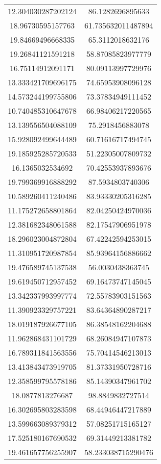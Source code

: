 \begin{table}
\begin{tabular}{cc}
12.304030287202124 & 86.1282696895633 \\
18.96730595157763 & 61.735632011487894 \\
19.84669496668335 & 65.3112018632176 \\
19.26841121591218 & 58.87085823977779 \\
16.75114912091171 & 80.09113997729976 \\
13.333421709696175 & 74.65953908096128 \\
14.573244199755806 & 73.37834949111452 \\
10.740485310647678 & 66.98406217220565 \\
13.139556504088109 & 75.2918456883078 \\
15.928092499644489 & 60.71616717494745 \\
19.185925285720533 & 51.22305007809732 \\
16.1365032534692 & 70.42553937893676 \\
19.799369916888292 & 87.5934803740306 \\
10.589260411240486 & 83.93330205316285 \\
11.175272658801864 & 82.04250424970036 \\
12.381682348061588 & 82.17547906951978 \\
18.296023004872804 & 67.42242594253015 \\
11.310951720987854 & 85.93964156886662 \\
19.476589745137538 & 56.0030438363745 \\
19.619450712957452 & 69.16473747145045 \\
13.342337993997774 & 72.55783903151563 \\
11.390923329757221 & 83.64364890287217 \\
18.019187926677105 & 86.38548162204688 \\
11.962868431101729 & 68.26084947107873 \\
16.789311841563556 & 75.70414546213013 \\
13.413843473919705 & 81.37331950728716 \\
12.358599795578186 & 85.14390347961702 \\
18.0877813276687 & 98.8849832727514 \\
16.302695803283598 & 68.44946447217889 \\
13.599663089379312 & 57.08251715165127 \\
17.525180167690532 & 69.31449213381782 \\
19.461657756255907 & 58.233038715290476 \\

\end{tabular}
\end{table}
